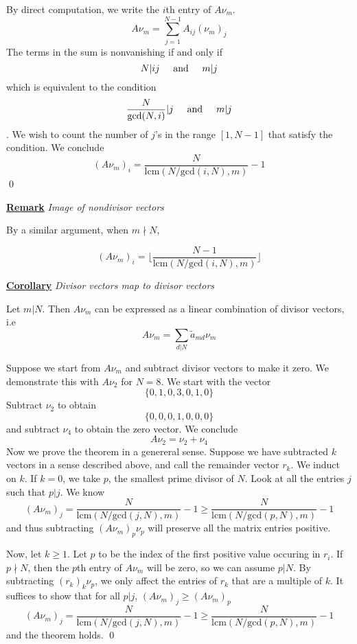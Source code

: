 \documentclass{article}
\newcommand{\new}[2]{
    \vspace{2mm}
    \noindent
    \textbf{
    \underline{#1}}
    \textit{
        {#2}
    }
    \vspace{2mm}
    \newline
}
\newcommand{\textAnd}{
    {
        \hspace{5mm}
        \textrm{and}
        \hspace{5mm}
    }
}
\begin{document}
\proof 
By direct computation, we write the $i$th entry of $A\nu_m$. 
\[
    A \nu_m = \sum_{j = 1}^{N - 1} A_{ij} (\nu_m)_j
\]
The terms in the sum is nonvanishing if and only if 
\[
    N|ij \textAnd m|j
\]
which is equivalent to the condition 
\[
    \frac N {\text{gcd}(N, i)} | j 
    \textAnd 
    m | j
\]
. We wish to count the number of $j$'s in the range $[1, N-1]$ 
that satisfy the condition. We conclude
\[
    (A \nu_m)_i = \frac N 
    {\text{lcm}(N/\text{gcd}(i, N), m)} - 1
\] \qed \hfill

\new{Remark} {Image of nondivisor vectors}
By a similar argument, when $m \nmid N$, 

\[
    (A \nu_m)_i = \bigg\lfloor\frac {N - 1} 
    {\text{lcm}(N/\text{gcd}(i, N), m)}\bigg \rfloor
\]



\new{Corollary} {Divisor vectors map to divisor vectors}
Let $m|N$. Then $ A \nu_m$ can be expressed as a linear 
combination of divisor vectors, i.e
\[
     A \nu_m = \sum_{d|N} \tilde a_{md} \nu_m
\]

\proof 
Suppose we start from $A\nu_m$ and subtract divisor vectors 
to make it zero. We demonstrate this with $A\nu_2$ for 
$N = 8$. We start with the vector 
\[
    \{0,1,0,3,0,1,0\}
\]
Subtract $\nu_2$ to obtain 
\[
\{0,0,0,1,0,0,0\}
\]
and subtract $\nu_4$ to obtain the zero vector. We conclude 
\[
A\nu_2 = \nu_2 + \nu_4
\]
Now we prove the theorem in a genereral sense. 
Suppose we have subtracted $k$ vectors in a sense described above, 
and call the remainder vector $r_k$. 
We induct on $k$. If $k = 0$, we take $p$, the smallest prime divisor 
of $N$. Look at all the entries $j$ such that $p|j$. We know 
\[
     (A \nu_m)_j = \frac N 
    {\text{lcm}(N/\text{gcd}(j, N), m)} - 1 \geq \frac N 
    {\text{lcm}(N/\text{gcd}(p, N), m)} - 1
\]
and thus subtracting $(A\nu_m)_p \nu_p$ will preserve 
all the matrix entries positive. 

Now, let $k \geq 1$. Let $p$ to be the index of the first 
positive value occuring in $r_i$. If $p \nmid N$, then the 
$p$th entry of $A\nu_m$ will be zero, so we can assume $p | N$.
By subtracting $(r_k)_k\nu_p$, we only affect the entries of $r_k$ 
that are a multiple of $k$. It suffices to show that for all $p|j$, 
$     (A \nu_m)_j \geq      (A \nu_m)_p$
\[
     (A \nu_m)_j = \frac N 
    {\text{lcm}(N/\text{gcd}(j, N), m)} - 1 \geq \frac N 
    {\text{lcm}(N/\text{gcd}(p, N), m)} - 1
\]
and the theorem holds. \hfill \qed
\end{document}

